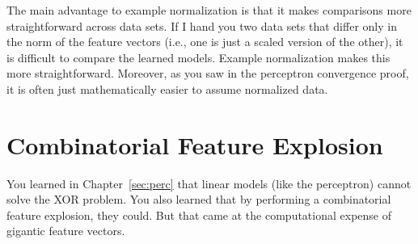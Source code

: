 The main advantage to example normalization is that it makes
comparisons more straightforward across data sets.  If I hand you two
data sets that differ only in the norm of the feature vectors (i.e.,
one is just a scaled version of the other), it is difficult to compare
the learned models.  Example normalization makes this more
straightforward.  Moreover, as you saw in the perceptron convergence
proof, it is often just mathematically easier to assume normalized
data.

\section{Combinatorial Feature Explosion}
\label{sec:prac:combinatorial}

You learned in Chapter~\ref{sec:perc} that linear models (like the
perceptron) cannot solve the XOR problem.  You also learned that by
performing a combinatorial feature explosion, they could.  But that
came at the computational expense of gigantic feature vectors.

\begin{comment}
To make things more formal, suppose that you are given a feature
vector $\vx$ in $D$-dimensional space.  Call these original features
the ``base features.''  There are several types of feature
combinations you could add:
\begin{enumerate}
\item Products: for all $d,d'$, create a feature whose value is $x_d
  \times x_{d'}$.  In the case of binary features, this corresponds to
  an ``and'' operation.
\item Sums: for all $d,d'$, create a feature whose value is $x_d
  + x_{d'}$.  In the case of binary features, this roughly corresponds to
  an ``or'' operation.
\item Log-transform: for all $d$, create a feature whose value is
  $\log x_d$.  (Only makes sense for non-negative features.)
\item Power-transform: for all $d$, create a feature whose value is
  $x_d^k$ for some $k$.
\end{enumerate}
Call features that are generated in these ways ``meta features.''
Now, there is nothing preventing you from combining meta features into
more complex ``meta meta features'' and so on.  Eventually you could
have a feature like:
\begin{equation}
  x_5 \times \log x_2 + (\log x_{10} + x_{16})^5 \times \log (x_{1}^2
  + x_{5})
\end{equation}
Such a feature might not be pariticularly \emph{useful}, but you could
certainly construct it.

In principle any one of these ``meta meta features'' might be
helpful.  Unfortunately, there is a combinatorial explosion of
possibilities, even with just these four constructions (technically
``power'' is unnecessary since it can be obtained through repeated
products).  Moreover, as you know, learning algorithms can be fooled
by features that look good by chance, but aren't actually good.  By
generating this combinatorial explosion of features, you run the risk
of creating \emph{many} features that look good by chance.
\end{comment}

